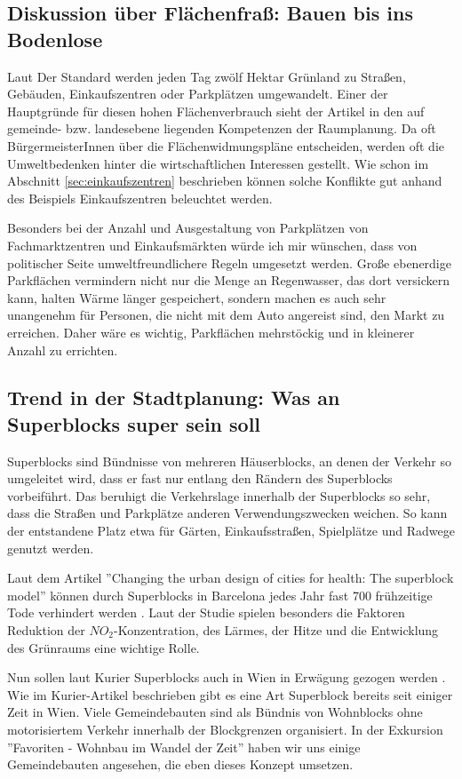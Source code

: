 \documentclass[]{article}
\begin{document}
\subsection{Diskussion über Flächenfraß: Bauen bis ins Bodenlose}
Laut Der Standard werden jeden Tag zwölf Hektar Grünland zu Straßen, Gebäuden, Einkaufszentren oder Parkplätzen umgewandelt.\cite{bauen_bis_ins_bodenlose} Einer der Hauptgründe für diesen hohen Flächenverbrauch sieht der Artikel in den auf gemeinde- bzw. landesebene liegenden Kompetenzen der Raumplanung. Da oft BürgermeisterInnen über die Flächenwidmungspläne entscheiden, werden oft die Umweltbedenken hinter die wirtschaftlichen Interessen gestellt. Wie schon im Abschnitt \ref{sec:einkaufszentren} beschrieben können solche Konflikte gut anhand des Beispiels Einkaufszentren beleuchtet werden.

Besonders bei der Anzahl und Ausgestaltung von Parkplätzen von Fachmarktzentren und Einkaufsmärkten würde ich mir wünschen, dass von politischer Seite umweltfreundlichere Regeln umgesetzt werden. Große ebenerdige Parkflächen vermindern nicht nur die Menge an Regenwasser, das dort versickern kann, halten Wärme länger gespeichert, sondern machen es auch sehr unangenehm für Personen, die nicht mit dem Auto angereist sind, den Markt zu erreichen. Daher wäre es wichtig, Parkflächen mehrstöckig und in kleinerer Anzahl zu errichten.

\subsection{Trend in der Stadtplanung: Was an Superblocks super sein soll}
Superblocks sind Bündnisse von mehreren Häuserblocks, an denen der Verkehr so umgeleitet wird, dass er fast nur entlang den Rändern des Superblocks vorbeiführt. Das beruhigt die Verkehrslage innerhalb der Superblocks so sehr, dass die Straßen und Parkplätze anderen Verwendungszwecken weichen. So kann der entstandene Platz etwa für Gärten, Einkaufsstraßen, Spielplätze und Radwege genutzt werden.

Laut dem Artikel ''Changing the urban design of cities for health: The superblock model'' können durch Superblocks in Barcelona jedes Jahr fast 700 frühzeitige Tode verhindert werden \cite{superblock_barcelona}. Laut der Studie spielen besonders die Faktoren Reduktion der $NO_2$-Konzentration, des Lärmes, der Hitze und die Entwicklung des Grünraums eine wichtige Rolle.

Nun sollen laut Kurier Superblocks auch in Wien in Erwägung gezogen werden \cite{superblocks_wien}. Wie im Kurier-Artikel beschrieben gibt es eine Art Superblock bereits seit einiger Zeit in Wien. Viele Gemeindebauten sind als Bündnis von Wohnblocks ohne motorisiertem Verkehr innerhalb der Blockgrenzen organisiert. In der Exkursion ''Favoriten - Wohnbau im Wandel der Zeit'' haben wir uns einige Gemeindebauten angesehen, die eben dieses Konzept umsetzen.
\end{document}
